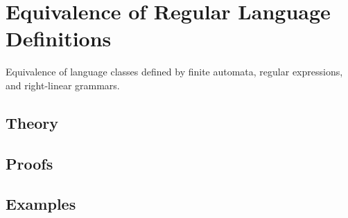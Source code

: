 
\section{Equivalence of Regular Language Definitions}
\label{sec:2.3a.08-regular-equivalence}

\begin{ticket}
Equivalence of language classes defined by finite automata, regular expressions, and right-linear grammars.
\end{ticket}

\subsection*{Theory}

\subsection*{Proofs}

\subsection*{Examples}
